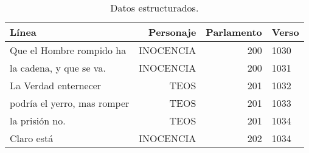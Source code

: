\begin{table}[!ht]
	\centering\small
	\ttfamily
	\begin{tabular}{lrrl}
		\toprule
		Línea&Personaje&Parlamento&Verso\\
		\midrule
		Que el Hombre rompido ha&INOCENCIA&200&1030\\
		la cadena, y que se va.&INOCENCIA&200&1031\\
		La Verdad enternecer&TEOS&201&1032\\
		podría el yerro, mas romper&TEOS&201&1033\\
		la prisión no.&TEOS&201&1034\\
		Claro está&INOCENCIA&202&1034\\
		\bottomrule
	\end{tabular}
\normalfont
	\caption{Datos estructurados.}
	\label{tab:datosestructurados}
\end{table}

